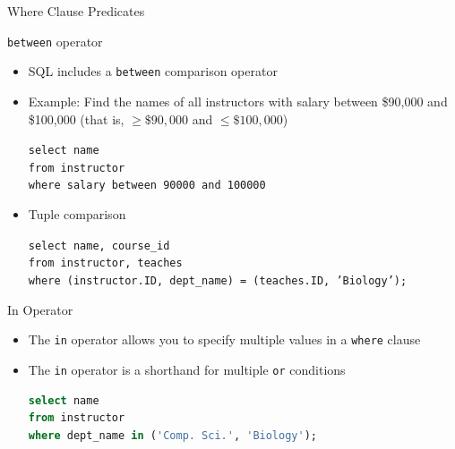\documentclass[aspectratio=169, xcolor=dvipsnames]{beamer}
\begin{document}
\begin{frame}{Where Clause Predicates}
    \begin{block}{\texttt{between} operator}
        \begin{itemize}[<+->]
            \item SQL includes a \texttt{between} comparison operator
            \item Example: Find the names of all instructors with salary between \$90,000 and \$100,000 (that is, $\geq \$90,000$ and $\leq \$100,000$)
            \begin{center}
                \texttt{select name \\
                        from instructor \\
                        where salary between 90000 and 100000}
            \end{center}
            \item Tuple comparison
            \begin{center}
                \texttt{select name, course\_id \\
                        from instructor, teaches \\
                        where (instructor.ID, dept\_name) = (teaches.ID, 'Biology');}
            \end{center}
        \end{itemize}
    \end{block}
\end{frame}

\begin{frame}[fragile]{In Operator}
    \begin{itemize}
        \item The \texttt{in} operator allows you to specify multiple values in a \texttt{where} clause
        \item The \texttt{in} operator is a shorthand for multiple \texttt{or} conditions
        \begin{lstlisting}[language=SQL]
select name
from instructor
where dept_name in ('Comp. Sci.', 'Biology');
        \end{lstlisting}
    \end{itemize}
\end{frame}
\end{document}

